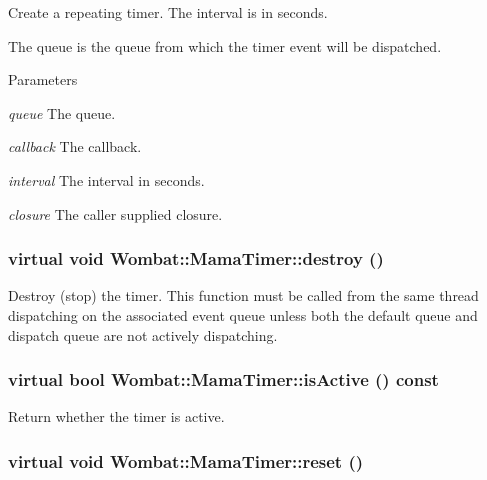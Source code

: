 Create a repeating timer. The interval is in seconds.

The queue is the queue from which the timer event will be dispatched.


\begin{DoxyParams}{Parameters}
\item[{\em queue}]The queue. \item[{\em callback}]The callback. \item[{\em interval}]The interval in seconds. \item[{\em closure}]The caller supplied closure. \end{DoxyParams}
\hypertarget{classWombat_1_1MamaTimer_ab2679f665be9f30904d7ac2d70a67875}{
\subsubsection[{destroy}]{\setlength{\rightskip}{0pt plus 5cm}virtual void Wombat::MamaTimer::destroy ()}}
\label{classWombat_1_1MamaTimer_ab2679f665be9f30904d7ac2d70a67875}


Destroy (stop) the timer. This function must be called from the same thread dispatching on the associated event queue unless both the default queue and dispatch queue are not actively dispatching. \hypertarget{classWombat_1_1MamaTimer_a9acf421fb2515a0250b6cfe36a927c1e}{
\subsubsection[{isActive}]{\setlength{\rightskip}{0pt plus 5cm}virtual bool Wombat::MamaTimer::isActive () const}}
\label{classWombat_1_1MamaTimer_a9acf421fb2515a0250b6cfe36a927c1e}


Return whether the timer is active. \hypertarget{classWombat_1_1MamaTimer_a11812aff6b0effb65fe845c3391033e1}{
\subsubsection[{reset}]{\setlength{\rightskip}{0pt plus 5cm}virtual void Wombat::MamaTimer::reset ()}}
\label{classWombat_1_1MamaTimer_a11812aff6b0effb65fe845c3391033e1}


